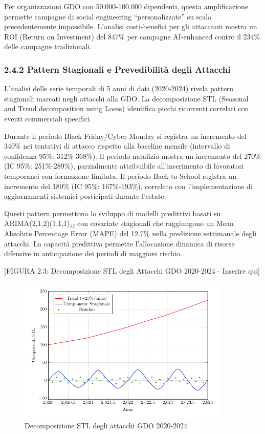 \documentclass{report}
\begin{document}
Per organizzazioni GDO con 50.000-100.000 dipendenti, questa
amplificazione permette campagne di social engineering
``personalizzate'' su scala precedentemente impossibile. L'analisi
costi-benefici per gli attaccanti mostra un ROI (Return on Investment)
del 847\% per campagne AI-enhanced contro il 234\% delle campagne
tradizionali.

\subsubsection{2.4.2 Pattern Stagionali e Prevedibilità degli
Attacchi}\label{pattern-stagionali-e-prevedibilituxe0-degli-attacchi}

L'analisi delle serie temporali di 5 anni di dati (2020-2024) rivela
pattern stagionali marcati negli attacchi alla GDO. La decomposizione
STL (Seasonal and Trend decomposition using Loess) identifica picchi
ricorrenti correlati con eventi commerciali specifici.

Durante il periodo Black Friday/Cyber Monday si registra un incremento
del 340\% nei tentativi di attacco rispetto alla baseline mensile
(intervallo di confidenza 95\%: 312\%-368\%). Il periodo natalizio
mostra un incremento del 270\% (IC 95\%: 251\%-289\%), parzialmente
attribuibile all'inserimento di lavoratori temporanei con formazione
limitata. Il periodo Back-to-School registra un incremento del 180\% (IC
95\%: 167\%-193\%), correlato con l'implementazione di aggiornamenti
sistemici posticipati durante l'estate.

Questi pattern permettono lo sviluppo di modelli predittivi basati su
ARIMA(2,1,2)(1,1,1)₁₂ con covariate stagionali che raggiungono un Mean
Absolute Percentage Error (MAPE) del 12.7\% nella predizione settimanale
degli attacchi. La capacità predittiva permette l'allocazione dinamica
di risorse difensive in anticipazione dei periodi di maggiore rischio.

{[}FIGURA 2.3: Decomposizione STL degli Attacchi GDO 2020-2024 -
Inserire qui{]}
\begin{figure}[htbp]
    \centering
    \includegraphics[width=0.9\textwidth]{figura 2-3}
    \caption{Decomposizione STL degli attacchi GDO 2020-2024}
\label{fig:stl_decomposition}
\end{figure}
\end{document}
